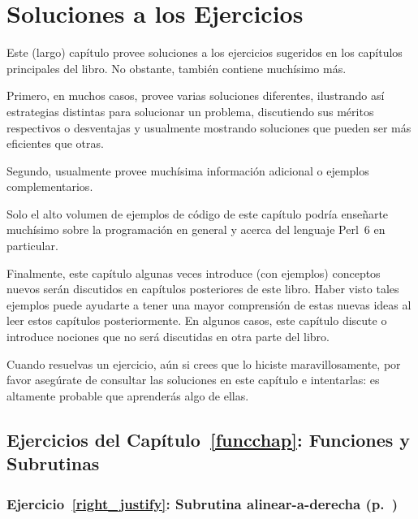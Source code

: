 \chapter{Soluciones a los Ejercicios}

Este (largo) capítulo provee soluciones a los ejercicios
sugeridos en los capítulos principales del libro. No obstante,
también contiene muchísimo más.

Primero, en muchos casos, provee varias soluciones diferentes,
ilustrando así estrategias distintas para solucionar un problema,
discutiendo sus méritos respectivos o desventajas y usualmente
mostrando soluciones que pueden ser más eficientes que otras.


Segundo, usualmente provee muchísima información adicional o ejemplos
complementarios.

Solo el alto volumen de ejemplos de código de este capítulo podría 
enseñarte muchísimo sobre la programación en general y acerca del lenguaje
Perl~6 en particular.

Finalmente, este capítulo algunas veces introduce (con ejemplos) conceptos
nuevos serán discutidos en capítulos posteriores de este libro. Haber visto
tales ejemplos puede ayudarte a tener una mayor comprensión de estas
nuevas ideas al leer estos capítulos posteriormente. En algunos casos, este
capítulo discute o introduce nociones que no será discutidas en otra
parte del libro.

Cuando resuelvas un ejercicio, aún si crees que lo hiciste maravillosamente,
por favor asegúrate de consultar las soluciones en este capítulo e intentarlas:
es altamente probable que aprenderás algo de ellas.

\section{Ejercicios del Capítulo~\ref{funcchap}: Funciones y Subrutinas}

\subsection{Ejercicio~\ref{right_justify}: Subrutina alinear-a-derecha (p.~\pageref{right_justify})}
\label{sol_right_justify}

